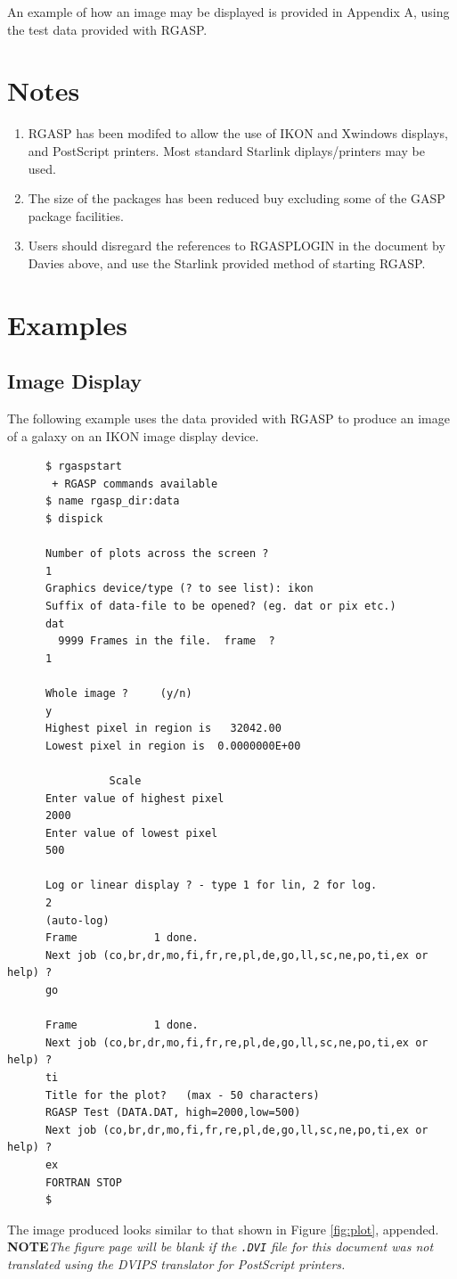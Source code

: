 \documentclass{article}
\renewcommand{\_}{{\tt\char'137}}     %
\begin{document}
An example of how an image may be displayed is provided in Appendix A, using
the test data provided with RGASP.

\section{Notes}

\begin{enumerate}
\item RGASP has been modifed to allow the use of IKON and Xwindows displays,
and PostScript printers. Most standard Starlink diplays/printers may be used.

\item The size of the packages has been reduced buy
excluding some of the GASP package facilities.

\item Users should disregard the references to RGASPLOGIN in the document by
Davies above, and use the Starlink provided method of starting RGASP.
\end{enumerate}

\pagebreak
\appendix
\section{Examples}
\subsection{Image Display}

The following example uses the data provided with RGASP to produce an image of
a galaxy on an IKON image display device.

\begin{verbatim}
      $ rgaspstart
       + RGASP commands available
      $ name rgasp_dir:data
      $ dispick

      Number of plots across the screen ?
      1
      Graphics device/type (? to see list): ikon
      Suffix of data-file to be opened? (eg. dat or pix etc.)
      dat
        9999 Frames in the file.  frame  ?
      1

      Whole image ?     (y/n)
      y
      Highest pixel in region is   32042.00
      Lowest pixel in region is  0.0000000E+00

                Scale
      Enter value of highest pixel
      2000
      Enter value of lowest pixel
      500

      Log or linear display ? - type 1 for lin, 2 for log.
      2
      (auto-log)
      Frame            1 done.
      Next job (co,br,dr,mo,fi,fr,re,pl,de,go,ll,sc,ne,po,ti,ex or help) ?
      go

      Frame            1 done.
      Next job (co,br,dr,mo,fi,fr,re,pl,de,go,ll,sc,ne,po,ti,ex or help) ?
      ti
      Title for the plot?   (max - 50 characters)
      RGASP Test (DATA.DAT, high=2000,low=500)
      Next job (co,br,dr,mo,fi,fr,re,pl,de,go,ll,sc,ne,po,ti,ex or help) ?
      ex
      FORTRAN STOP
      $
\end{verbatim}
The image produced looks similar to that shown in Figure \ref{fig:plot}, appended.
{\bf NOTE}{\it The figure page will be blank if the {\tt .DVI} file for this
document was not translated using the DVIPS translator for PostScript
printers.}
\end{document}

